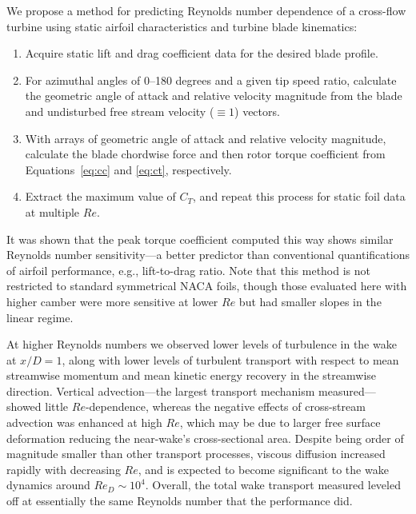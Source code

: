 \documentclass[energies,article,accept,moreauthors,pdftex,12pt,a4paper]{mdpi}
\begin{document}
We propose a method for predicting Reynolds number dependence of a cross-flow
turbine using static airfoil characteristics and turbine blade kinematics:
\begin{enumerate}
    \item Acquire static lift and drag coefficient data for the desired blade
    profile.
    
    \item For azimuthal angles of 0--180 degrees and a given tip speed ratio,
    calculate the geometric angle of attack and relative velocity magnitude from
    the blade and undisturbed free stream velocity ($\equiv 1$) vectors.
    
    \item With arrays of geometric angle of attack and relative velocity
    magnitude, calculate the blade chordwise force and then rotor torque
    coefficient from Equations~\ref{eq:cc} and \ref{eq:ct}, respectively.
    
    \item Extract the maximum value of $C_T$, and repeat this process for static
    foil data at multiple $Re$.
\end{enumerate}

It was shown that the peak torque coefficient computed this way shows similar
Reynolds number sensitivity---a better predictor than conventional
quantifications of airfoil performance, e.g., lift-to-drag ratio. Note that this
method is not restricted to standard symmetrical NACA foils, though those
evaluated here with higher camber were more sensitive at lower $Re$ but had
smaller slopes in the linear regime.

At higher Reynolds numbers we observed lower levels of turbulence in the wake at
$x/D=1$, along with lower levels of turbulent transport with respect to mean
streamwise momentum and mean kinetic energy recovery in the streamwise
direction. Vertical advection---the largest transport mechanism
measured---showed little $Re$-dependence, whereas the negative effects of
cross-stream advection was enhanced at high $Re$, which may be due to larger
free surface deformation reducing the near-wake's cross-sectional area. Despite
being order of magnitude smaller than other transport processes, viscous
diffusion increased rapidly with decreasing $Re$, and is expected to become
significant to the wake dynamics around $Re_D \sim 10^4$. Overall, the total
wake transport measured leveled off at essentially the same Reynolds number that
the performance did.
\end{document}
